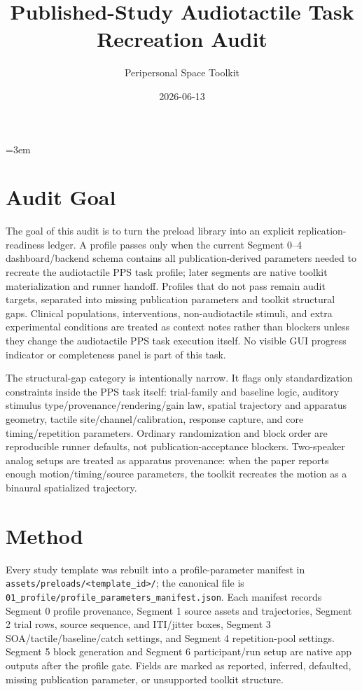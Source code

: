 \documentclass[11pt]{article}
\title{Published-Study Audiotactile Task Recreation Audit}
\author{Peripersonal Space Toolkit}
\date{2026-06-13}
\begin{document}
\emergencystretch=3em
\sloppy
\maketitle

\section*{Audit Goal}
The goal of this audit is to turn the preload library into an explicit replication-readiness ledger. A profile passes only when the current Segment 0--4 dashboard/backend schema contains all publication-derived parameters needed to recreate the audiotactile PPS task profile; later segments are native toolkit materialization and runner handoff. Profiles that do not pass remain audit targets, separated into missing publication parameters and toolkit structural gaps. Clinical populations, interventions, non-audiotactile stimuli, and extra experimental conditions are treated as context notes rather than blockers unless they change the audiotactile PPS task execution itself. No visible GUI progress indicator or completeness panel is part of this task.

The structural-gap category is intentionally narrow. It flags only standardization constraints inside the PPS task itself: trial-family and baseline logic, auditory stimulus type/provenance/rendering/gain law, spatial trajectory and apparatus geometry, tactile site/channel/calibration, response capture, and core timing/repetition parameters. Ordinary randomization and block order are reproducible runner defaults, not publication-acceptance blockers. Two-speaker analog setups are treated as apparatus provenance: when the paper reports enough motion/timing/source parameters, the toolkit recreates the motion as a binaural spatialized trajectory.

\section*{Method}
Every study template was rebuilt into a profile-parameter manifest in \texttt{assets/preloads/<template\_id>/}; the canonical file is \texttt{01\_profile/profile\_parameters\_manifest.json}. Each manifest records Segment 0 profile provenance, Segment 1 source assets and trajectories, Segment 2 trial rows, source sequence, and ITI/jitter boxes, Segment 3 SOA/tactile/baseline/catch settings, and Segment 4 repetition-pool settings. Segment 5 block generation and Segment 6 participant/run setup are native app outputs after the profile gate. Fields are marked as reported, inferred, defaulted, missing publication parameter, or unsupported toolkit structure.
\end{document}

